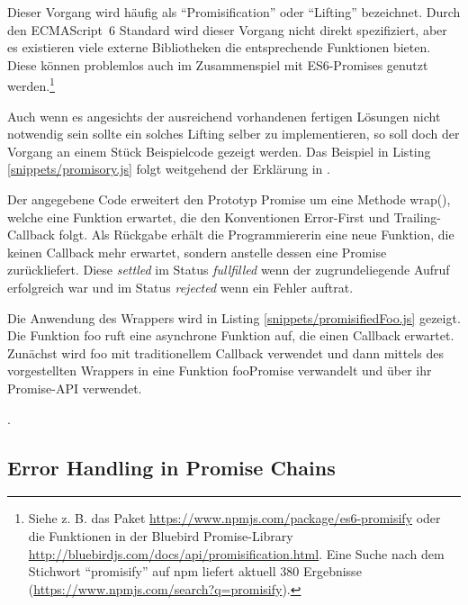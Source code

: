 \documentclass[
11pt, %
a4paper, %
oneside, %
pdfspacing, %
headinclude,
BCOR5mm, %
ngerman, %
bibtotocnumbered,
]{scrartcl}
\begin{document}
		Dieser Vorgang wird häufig als "`Promisification"' oder "`Lifting"' bezeichnet. Durch den ECMAScript~6 Standard wird dieser Vorgang nicht direkt spezifiziert, aber es existieren viele externe Bibliotheken die entsprechende Funktionen bieten. Diese können problemlos auch im Zusammenspiel mit ES6-Promises genutzt werden.\footnote{Siehe z. B. das Paket \url{https://www.npmjs.com/package/es6-promisify} oder die Funktionen in der Bluebird Promise-Library \url{http://bluebirdjs.com/docs/api/promisification.html}. Eine Suche nach dem Stichwort "`promisify"' auf \textsf{npm} liefert aktuell 380 Ergebnisse (\url{https://www.npmjs.com/search?q=promisify}).}
		
		Auch wenn es angesichts der ausreichend vorhandenen fertigen Lösungen nicht notwendig sein sollte ein solches Lifting selber zu implementieren, so soll doch der Vorgang an einem Stück Beispielcode gezeigt werden. Das Beispiel in Listing \ref{snippets/promisory.js} folgt weitgehend der Erklärung in \cite[S.~76]{Simpson.2015}.
		
		
		Der angegebene Code erweitert den Prototyp \textsf{Promise} um eine Methode \textsf{wrap()}, welche eine Funktion erwartet, die den Konventionen Error-First und Trailing-Callback folgt. Als Rückgabe erhält die Programmiererin eine neue Funktion, die keinen Callback mehr erwartet, sondern anstelle dessen eine Promise zurückliefert. Diese \emph{settled} im Status \emph{fullfilled} wenn der zugrundeliegende Aufruf erfolgreich war und im Status \emph{rejected} wenn ein Fehler auftrat.
		
		Die Anwendung des Wrappers wird in Listing \ref{snippets/promisifiedFoo.js} gezeigt. Die Funktion \textsf{foo} ruft eine asynchrone Funktion auf, die einen Callback erwartet. Zunächst wird \textsf{foo} mit traditionellem Callback verwendet und dann mittels des vorgestellten Wrappers in eine Funktion \textsf{fooPromise} verwandelt und über ihr Promise-API verwendet.
		
		.
	
	\subsection{Error Handling in Promise Chains}
	
\end{document}
